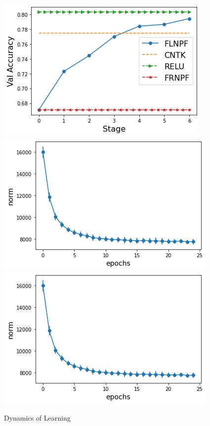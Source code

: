\begin{figure}[h]
\centering
\includegraphics[scale=0.25]{figs/gap.png}
\includegraphics[scale=0.25]{figs/path-gram.png}
\includegraphics[scale=0.25]{figs/path-gram.png}
\caption{Dynamics of Learning}
\label{fig:dynamics}
\end{figure}
